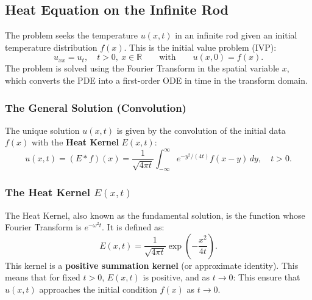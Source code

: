 \documentclass[12pt]{article}
\begin{document}
\subsection*{Heat Equation on the Infinite Rod}
The problem seeks the temperature $u(x,t)$ in an infinite rod given an initial temperature distribution $f(x)$. This is the initial value problem (IVP):
$$
u_{xx} = u_t, \quad t>0, \ x \in \mathbb{R} \qquad \text{with} \qquad u(x,0) = f(x).
$$
The problem is solved using the Fourier Transform in the spatial variable $x$, which converts the PDE into a first-order ODE in time in the transform domain.

\subsubsection*{The General Solution (Convolution)}
The unique solution $u(x,t)$ is given by the convolution of the initial data $f(x)$ with the \textbf{Heat Kernel} $E(x,t)$:
$$
u(x,t) = (E * f)(x) = \frac{1}{\sqrt{4\pi t}} \int_{-\infty}^{\infty} e^{-y^2/(4t)} f(x-y)\,dy, \quad t > 0.
$$

\subsubsection*{The Heat Kernel $E(x,t)$}
The Heat Kernel, also known as the fundamental solution, is the function whose Fourier Transform is $e^{-\omega^2 t}$. It is defined as:
$$
E(x, t) = \frac{1}{\sqrt{4\pi t}} \exp\left(-\frac{x^2}{4t}\right).
$$
This kernel is a \textbf{positive summation kernel} (or approximate identity). This means that for fixed $t>0$, $E(x,t)$ is positive, and as $t \to 0$:
This ensure that $u(x,t)$ approaches the initial condition $f(x)$ as $t \to 0$.
\end{document}
